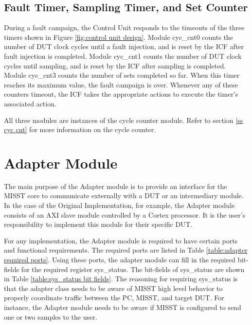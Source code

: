 \documentclass[]{report}
\begin{document}
\section{Fault Timer, Sampling Timer, and Set Counter}
\label{s fault, samp, set timers}

During a fault campaign, the Control Unit responds to the timeouts of the three timers shown in Figure \ref{fig:control unit design}. Module cyc\_cnt0 counts the number of DUT clock cycles until a fault injection, and is reset by the ICF after fault injection is completed. Module cyc\_cnt1 counts the number of DUT clock cycles until sampling, and is reset by the ICF after sampling is completed. Module cyc\_cnt3 counts the number of sets completed so far. When this timer reaches its maximum value, the fault campaign is over. Whenever any of these counters timeout, the ICF takes the appropriate actions to execute the timer's associated action.

All three modules are instances of the cycle counter module. Refer to section \ref{ss cyc cnt} for more information on the cycle counter. 

\chapter{Adapter Module}
\label{c adapter module}

The main purpose of the Adapter module is to provide an interface for the MISST core to communicate externally with a DUT or an intermediary module. In the case of the Original Implementation, for example, the Adapter module consists of an AXI slave module controlled by a Cortex processor. It is the user's responsibility to implement this module for their specific DUT.

For any implementation, the Adapter module is required to have certain ports and functional requirements. The required ports are listed in Table \ref{table:adapter required ports}. Using these ports, the adapter module can fill in the required bit-fields for the required register sys\_status. The bit-fields of sys\_status are shown in Table \ref{table:sys_status bit fields}. The reasoning for requiring sys\_status is that the adapter class needs to be aware of MISST high level behavior to properly coordinate traffic between the PC, MISST, and target DUT. For instance, the Adapter module needs to be aware if MISST is configured to send one or two samples to the user.
\end{document}
